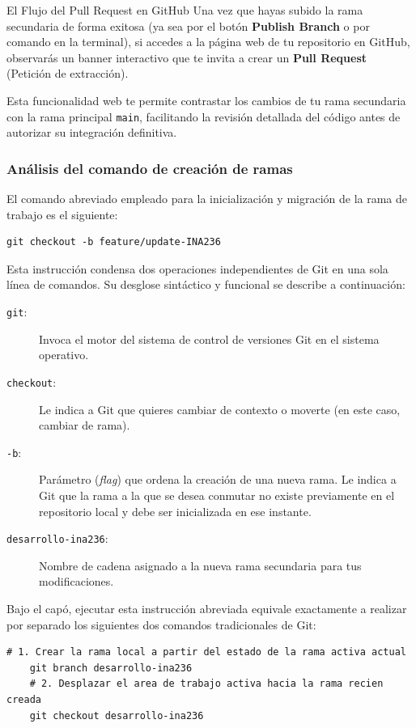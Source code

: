 \documentclass[
10pt, %
a4paper, %
oneside, %
headinclude,footinclude, %
BCOR5mm, %
]{scrartcl}
\begin{document}
\begin{InfoBox}{El Flujo del Pull Request en GitHub}
	Una vez que hayas subido la rama secundaria de forma exitosa (ya sea por el botón \textbf{Publish Branch} o por comando en la terminal), si accedes a la página web de tu repositorio en GitHub, observarás un banner interactivo que te invita a crear un \textbf{Pull Request} (Petición de extracción). 
	
	Esta funcionalidad web te permite contrastar los cambios de tu rama secundaria con la rama principal \texttt{main}, facilitando la revisión detallada del código antes de autorizar su integración definitiva.
\end{InfoBox}

\subsubsection{Análisis del comando de creación de ramas}
El comando abreviado empleado para la inicialización y migración de la rama de trabajo es el siguiente:
\begin{lstlisting}[language=DOS]
	git checkout -b feature/update-INA236
\end{lstlisting}
Esta instrucción condensa dos operaciones independientes de Git en una sola línea de comandos. Su desglose sintáctico y funcional se describe a continuación:
\begin{description}
	\item[\texttt{git}:] Invoca el motor del sistema de control de versiones Git en el sistema operativo.
	\item[\texttt{checkout}:] Le indica a Git que quieres cambiar de contexto o moverte (en este caso, cambiar de rama).
	\item[\texttt{-b}:] Parámetro (\textit{flag}) que ordena la creación de una nueva rama. Le indica a Git que la rama a la que se desea conmutar no existe previamente en el repositorio local y debe ser inicializada en ese instante.
	\item[\texttt{desarrollo-ina236}:] Nombre de cadena asignado a la nueva rama secundaria para tus modificaciones.
\end{description}
Bajo el capó, ejecutar esta instrucción abreviada equivale exactamente a realizar por separado los siguientes dos comandos tradicionales de Git:
\begin{lstlisting}[style=CMakeStyle]
	# 1. Crear la rama local a partir del estado de la rama activa actual
	git branch desarrollo-ina236
	# 2. Desplazar el area de trabajo activa hacia la rama recien creada
	git checkout desarrollo-ina236
\end{lstlisting}
\end{document}

